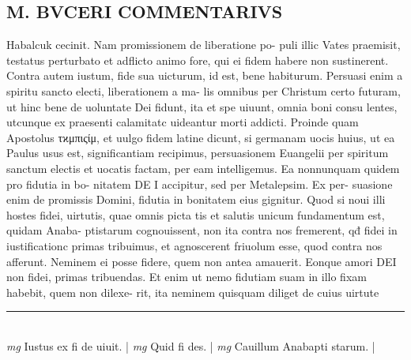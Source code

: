 \documentclass{article}
\begin{document}
\begin{pages}
\section*{M. BVCERI COMMENTARIVS }
\marginpar{[ p.20 ]}\pstart Habalcuk cecinit.  Nam promissionem de liberatione po- puli illic Vates praemisit, testatus perturbato et adflicto animo fore, qui ei fidem habere non sustinerent. Contra autem iustum, fide sua uicturum, id est, bene habiturum.  Persuasi enim a spiritu sancto electi, liberationem a ma- lis omnibus per Christum certo futuram, ut hinc bene de uoluntate Dei fidunt, ita et spe uiuunt, omnia boni consu lentes, utcunque ex praesenti calamitatc uideantur morti addicti.   \pend\pstart Proinde quam Apostolus τϰμπιςίμ, et uulgo fidem latine dicunt, si germanam uocis huius, ut ea Paulus usus est, significantiam recipimus, persuasionem Euangelii per spiritum sanctum electis et uocatis factam, per eam intelligemus. Ea nonnunquam quidem pro fidutia in bo-  nitatem DE I accipitur, sed per Metalepsim.  Ex per- suasione enim de promissis Domini, fidutia in bonitatem eius gignitur.  \pend\pstart Quod si noui illi hostes fidei, uirtutis, quae omnis picta tis et salutis unicum fundamentum est, quidam Anaba- ptistarum cognouissent, non ita contra nos fremerent, qđ fidei in iustificationc primas tribuimus, et agnoscerent friuolum esse, quod contra nos afferunt.  Neminem ei posse fidere, quem non antea amauerit.  Eonque amori DEI non fidei, primas tribuendas.  Et enim ut nemo fidutiam suam in illo fixam habebit, quem non dilexe- rit, ita neminem quisquam diliget de cuius uirtute  \pend
\vspace{0.5cm}\noindent
\vspace{0.2cm}\rule{1cm}{0.2pt}\\ 
\hspace{0.2cm}\textit{mg}
\footnotesize Iustus ex fi de uiuit.  
\normalsize| 
\hspace{0.2cm}\textit{mg}
\footnotesize Quid fi des.  
\normalsize| 
\hspace{0.2cm}\textit{mg}
\footnotesize Cauillum Anabapti starum.  
\normalsize| 

\end{pages}
\end{document}

